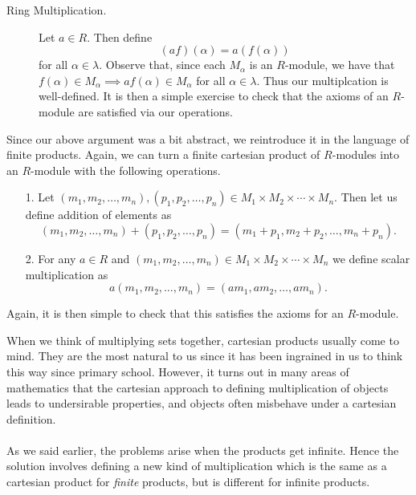 \documentclass[12pt,letterpaper]{algebra_book}
\theoremstyle{definition}
\begin{document}
\begin{definition}
\begin{prf}
\begin{description}
            \item[Ring Multiplication.] Let $a \in R$. Then define 
            \[
                (af)(\alpha) = a(f(\alpha))  
            \] 
            for all $\alpha \in \lambda$. Observe that, since each
            $M_\alpha$ is an $R$-module, we have that $f(\alpha) \in
            M_\alpha \implies af(\alpha) \in M_\alpha$ for all $\alpha
            \in \lambda$. Thus our multiplcation is well-defined. It is then a simple exercise to check that
            the axioms of an $R$-module are satisfied via our operations.
        \end{description}
    \end{prf}

    Since our above argument was a bit abstract, we reintroduce
    it in the language of finite products.
    Again, we can turn a finite cartesian product of
    $R$-modules into an $R$-module with the following operations.
\begin{itemize}
    \item[1.] Let $(m_1, m_2, \dots, m_n), (p_1, p_2 ,\dots,
    p_n) \in M_1 \times M_2 \times \cdots \times M_n$. Then let us define
    addition of elements as
    \[
        (m_1, m_2, \dots, m_n) + (p_1, p_2 ,\dots, p_n)
        = (m_1 + p_1, m_2 + p_2, \dots, m_n + p_n).
    \] 
    \item[2.] For any $a \in R$ and $(m_1, m_2, \dots, m_n) \in
    M_1 \times M_2 \times \cdots \times M_n$ we define scalar
    multiplication as 
    \[
        a(m_1, m_2, \dots, m_n) = (am_1, am_2, \dots, am_n).
    \] 
\end{itemize}
\end{definition}
Again, it is then simple to check that this satisfies the axioms
for an $R$-module. 

\textcolor{NavyBlue}{When we think of multiplying sets together,
cartesian products usually come to mind. They are the most natural
to us since it has been ingrained in us to think this way since
primary school. However, it turns out in many areas of mathematics
that the cartesian approach to defining multiplication of objects
leads to undersirable properties, and objects often misbehave
under a cartesian definition. 
\\
\\
As we said earlier, the problems arise when the products get
infinite. Hence the solution involves defining a new kind of
multiplication which is the same as a cartesian product for
\textit{finite} products, but is different for infinite products.}
\end{document}
